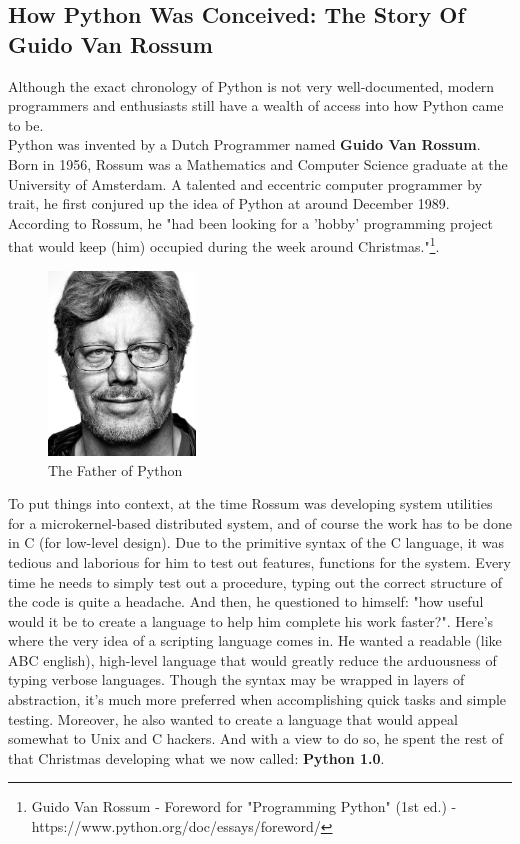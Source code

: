 \documentclass[twoside,final]{hcmut-report}
\begin{document}
\subsection{How Python Was Conceived: The Story Of Guido Van Rossum}
\hspace*{3mm}Although the exact chronology of Python is not very well-documented, modern programmers and enthusiasts still have a wealth of access into how Python came to be.\\
\hspace*{3mm} Python was invented by a Dutch Programmer named \textbf{Guido Van Rossum}. Born in 1956, Rossum was a Mathematics and Computer Science graduate at the University of Amsterdam. A talented and eccentric computer programmer by trait, he first conjured up the idea of Python at around December 1989. According to Rossum, he "had been looking for a 'hobby' programming project that would keep (him) occupied during the week around Christmas."\footnote{Guido Van Rossum - Foreword for "Programming Python" (1st ed.)  - https://www.python.org/doc/essays/foreword/}.  
\begin{figure}[ht]
\centering
\includegraphics[width=0.35\textwidth]{graphics/rossum.jpeg}
\caption{The Father of Python}

\end{figure}
To put things into context, at the time Rossum was developing system utilities for a microkernel-based distributed system, and of course the work has to be done in C (for low-level design). Due to the primitive syntax of the C language, it was tedious and laborious for him to test out features, functions for the system. Every time he needs to simply test out a procedure, typing out the correct structure of the code is quite a headache. And then, he questioned to himself: "how useful would it be to create a language to help him complete his work faster?". Here's where the very idea of a scripting language comes in. He wanted a readable (like ABC english), high-level language that would greatly reduce the arduousness of typing verbose languages. Though the syntax may be wrapped in layers of abstraction, it's much more preferred when accomplishing quick tasks and simple testing. Moreover, he also wanted to create a language that would appeal somewhat to Unix and C hackers. And with a view to do so, he spent the rest of that Christmas developing what we now called: \textbf{Python 1.0}.
\end{document}
